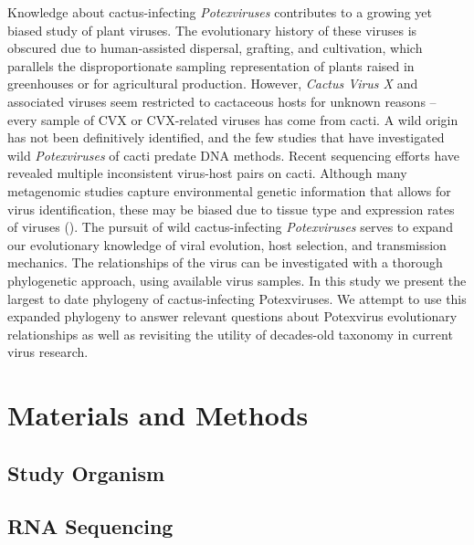 \documentclass[11pt,letterpaper,titlepage]{article}
\begin{document}
\begin{linenumbers}
Knowledge about cactus-infecting \textit{Potexviruses} contributes to a growing yet biased study of plant viruses. 
The evolutionary history of these viruses is obscured due to human-assisted dispersal, grafting, and cultivation, which parallels the disproportionate sampling representation of plants raised in greenhouses or for agricultural production. 
However, \textit{Cactus Virus X} and associated viruses seem restricted to cactaceous hosts for unknown reasons -- every sample of CVX or CVX-related viruses has come from cacti. 
A wild origin has not been definitively identified, and the few studies that have investigated wild \textit{Potexviruses} of cacti predate DNA methods.
Recent sequencing efforts have revealed multiple inconsistent virus-host pairs on cacti. 
Although many metagenomic studies capture environmental genetic information that allows for virus identification, these may be biased due to tissue type and expression rates of viruses (\cite{lacroix2016methodological}). 
The pursuit of wild cactus-infecting \textit{Potexviruses} serves to expand our evolutionary knowledge of viral evolution, host selection, and transmission mechanics. 
The relationships of the virus can be investigated with a thorough phylogenetic approach, using available virus samples. 
In this study we present the largest to date phylogeny of cactus-infecting Potexviruses. 
We attempt to use this expanded phylogeny to answer relevant questions about Potexvirus evolutionary relationships as well as revisiting the utility of decades-old taxonomy in current virus research. 


\section*{Materials and Methods}

\subsection*{Study Organism}


\subsection*{RNA Sequencing}


\end{linenumbers}
\end{document}
